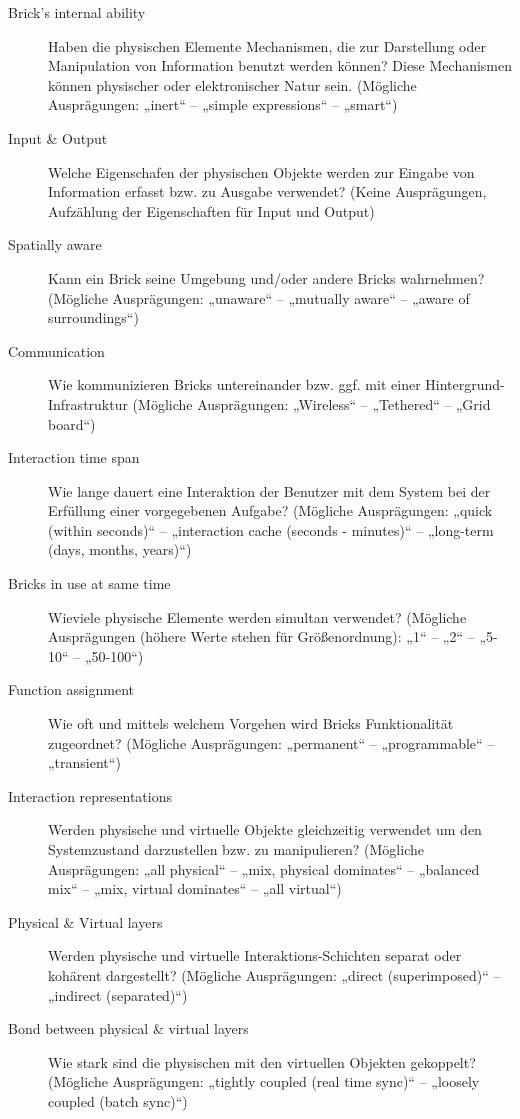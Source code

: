 \begin{description}
	\item[Brick's internal ability] Haben die physischen Elemente Mechanismen, die zur Darstellung oder Manipulation von Information benutzt werden können? Diese Mechanismen können physischer oder elektronischer Natur sein. (Mögliche Ausprägungen: „inert“ -- „simple expressions“ -- „smart“) 
	\item[Input \& Output] Welche Eigenschafen der physischen Objekte werden zur Eingabe von Information erfasst bzw. zu Ausgabe verwendet? (Keine Ausprägungen, Aufzählung der Eigenschaften für Input und Output)
	\item[Spatially aware] Kann ein Brick seine Umgebung und/oder andere Bricks wahrnehmen? (Mögliche Ausprägungen: „unaware“ -- „mutually aware“ -- „aware of surroundings“) 
	\item[Communication] Wie kommunizieren Bricks untereinander bzw. ggf. mit einer Hintergrund-Infrastruktur (Mögliche Ausprägungen: „Wireless“ -- „Tethered“ -- „Grid board“)
	\item[Interaction time span] Wie lange dauert eine Interaktion der Benutzer mit dem System bei der Erfüllung einer vorgegebenen Aufgabe? (Mögliche Ausprägungen: „quick (within seconds)“ -- „interaction cache (seconds - minutes)“ -- „long-term (days, months, years)“)
	\item[Bricks in use at same time] Wieviele physische Elemente werden simultan verwendet? (Mögliche Ausprägungen (höhere Werte stehen für Größenordnung): „1“ -- „2“ -- „5-10“ -- „50-100“)
	\item[Function assignment] Wie oft und mittels welchem Vorgehen wird Bricks Funktionalität zugeordnet? (Mögliche Ausprägungen: „permanent“ -- „programmable“ -- „transient“) 
	\item[Interaction representations] Werden physische und virtuelle Objekte gleichzeitig verwendet um den Systemzustand darzustellen bzw. zu manipulieren? (Mögliche Ausprägungen: „all physical“ -- „mix, physical dominates“ -- „balanced mix“ -- „mix, virtual dominates“ -- „all virtual“)
	\item[Physical \& Virtual layers] Werden physische und virtuelle Interaktions-Schichten separat oder kohärent dargestellt? (Mögliche Ausprägungen: „direct (superimposed)“ -- „indirect (separated)“)
	\item[Bond between physical \& virtual layers] Wie stark sind die physischen mit den virtuellen Objekten gekoppelt? (Mögliche Ausprägungen: „tightly coupled (real time sync)“ -- „loosely coupled (batch sync)“)

\end{description}
